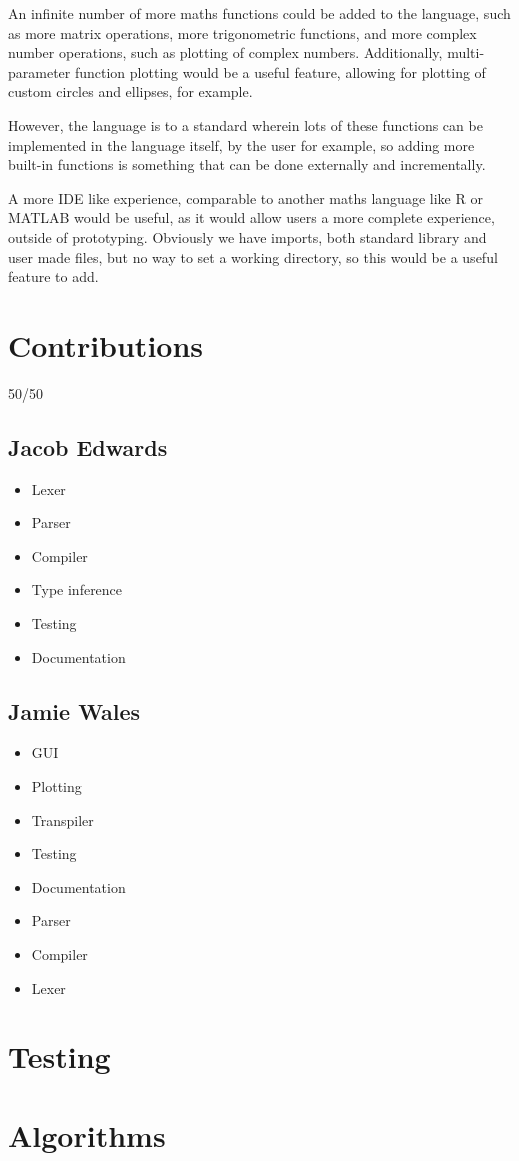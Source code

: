 \documentclass[a4paper, oneside, 11pt]{report}
\begin{document}
An infinite number of more maths functions could be added to the language, such as more matrix operations, more
trigonometric functions, and more complex number operations, such as plotting of complex numbers.
Additionally, multi-parameter function plotting would be a useful feature, allowing for plotting of custom circles and
ellipses, for example.

However, the language is to a standard wherein lots of these functions can be implemented in the language itself, by 
the user for example, so adding more built-in functions is something that can be done externally and incrementally.

A more IDE like experience, comparable to another maths language like R or MATLAB would be useful, as it would allow 
users a more complete experience, outside of prototyping.
Obviously we have imports, both standard library and user made files, but no way to set a working 
directory, so this would be a useful feature to add.






\appendix
\chapter{Contributions}\label{ch:contributions}

50/50

\section{Jacob Edwards}\label{sec:jacob-edwards}

\begin{itemize}
    \item Lexer
    \item Parser
    \item Compiler
    \item Type inference
    \item Testing
    \item Documentation
\end{itemize}

\section{Jamie Wales}\label{sec:jamie-wales}

\begin{itemize}
    \item GUI
    \item Plotting
    \item Transpiler
    \item Testing
    \item Documentation
    \item Parser
    \item Compiler
    \item Lexer
\end{itemize}

\chapter{Testing}\label{ch:test}



\chapter{Algorithms}\label{ch:algorithms}


\end{document}
